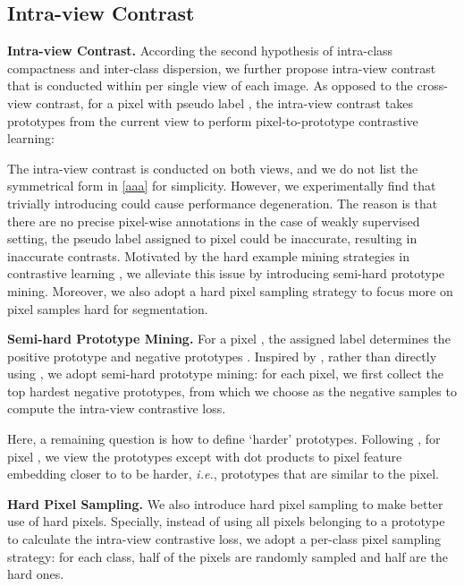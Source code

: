 \documentclass[10pt,twocolumn,letterpaper]{article}
\begin{document}
\subsection{Intra-view Contrast}
\textbf{Intra-view Contrast.} 
According the second hypothesis of intra-class compactness and inter-class dispersion, we further propose intra-view contrast that is conducted within per single view of each image.
As opposed to the cross-view contrast, for a pixel  with pseudo label , the intra-view contrast takes prototypes  from the current view to perform pixel-to-prototype contrastive learning:



The intra-view contrast is conducted on both views, and we do not list the symmetrical form in \cref{aaa} for simplicity.
However, we experimentally find that trivially introducing  could cause performance degeneration. 
The reason is that there are no precise pixel-wise annotations in the case of weakly supervised setting, the pseudo label  assigned to pixel  could be inaccurate, resulting in inaccurate contrasts.
Motivated by the hard example mining strategies in contrastive learning \cite{CLwith_hard_negatives, wang2021exploring_fully_supervised}, we alleviate this issue by introducing semi-hard prototype mining.
Moreover, we also adopt a hard pixel sampling strategy to focus more on pixel samples hard for segmentation.


\textbf{Semi-hard Prototype Mining.} For a pixel , the assigned label  determines the positive prototype  and negative prototypes .
Inspired by \cite{wang2021exploring_fully_supervised}, rather than directly using , we adopt semi-hard prototype mining: for each pixel, we first collect the top  hardest negative prototypes, from which we choose  as the negative samples to compute the intra-view contrastive loss.


Here, a remaining question is how to define `harder' prototypes. Following \cite{wang2021exploring_fully_supervised}, for pixel , we view the prototypes except  with dot products to pixel feature embedding  closer to  to be harder, \textit{i.e.}, prototypes that are similar to the pixel. 




\textbf{Hard Pixel Sampling.} We also introduce hard pixel sampling to make better use of hard pixels.
Specially, instead of using all pixels belonging to a prototype  to calculate the intra-view contrastive loss, we adopt a per-class pixel sampling strategy: for each class, half of the pixels are randomly sampled and half are the hard ones.
\end{document}
